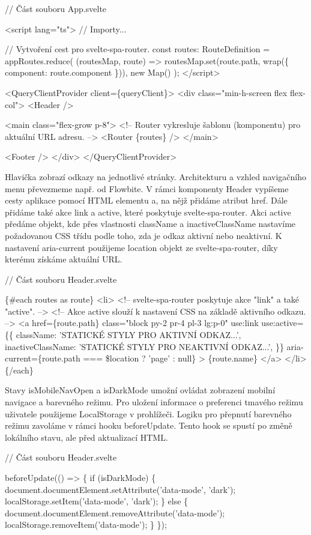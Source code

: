 \begin{prog}
// Část souboru App.svelte

<script lang="ts">
  // Importy...

  // Vytvoření cest pro svelte-spa-router.
  const routes: RouteDefinition = appRoutes.reduce(
    (routesMap, route) => routesMap.set(route.path, wrap(\{
      component: route.component
    \})),
    new Map()
  );
</script>

<QueryClientProvider client=\{queryClient\}>
  <div class="min-h-screen flex flex-col">
    <Header />

    <main class="flex-grow p-8">
      <!-- Router vykresluje šablonu (komponentu) pro aktuální URL adresu. -->
      <Router \{routes\} />
    </main>

    <Footer />
  </div>
</QueryClientProvider>
\end{prog}

Hlavička zobrazí odkazy na jednotlivé stránky. Architekturu a vzhled navigačního menu převezmeme např. od Flowbite. 
V rámci komponenty Header vypíšeme cesty aplikace pomocí HTML elementu a, na nějž přidáme atribut href. Dále přidáme také akce link a active, které poskytuje svelte-spa-router. 
Akci active předáme objekt, kde přes vlastnosti className a inactiveClassName nastavíme požadovanou CSS třídu podle toho, zda je odkaz aktivní nebo neaktivní. 
K nastavení aria-current použijeme location objekt ze svelte-spa-router, díky kterému získáme aktuální URL.

\begin{prog}
// Část souboru Header.svelte

\{#each routes as route\}
  <li>
    <!-- svelte-spa-router poskytuje akce "link" a také "active". -->
    <!-- Akce active slouží k nastavení CSS na základě aktivního odkazu. -->
    <a
      href=\{route.path\}
      class="block py-2 pr-4 pl-3 lg:p-0"
      use:link
      use:active=\{\{
        className: 'STATICKÉ STYLY PRO AKTIVNÍ ODKAZ...',
        inactiveClassName: 'STATICKÉ STYLY PRO NEAKTIVNÍ ODKAZ...',
      \}\}
      aria-current=\{route.path === \$location ? 'page' : null\}
    >
      \{route.name\}
    </a>
  </li>
\{/each\}
\end{prog}

Stavy isMobileNavOpen a isDarkMode umožní ovládat zobrazení mobilní navigace a barevného režimu. 
Pro uložení informace o preferenci tmavého režimu uživatele použijeme LocalStorage v prohlížeči. Logiku pro přepnutí barevného režimu zavoláme v rámci hooku beforeUpdate. 
Tento hook se spustí po změně lokálního stavu, ale před aktualizací HTML.

\begin{prog}
// Část souboru Header.svelte

beforeUpdate(() => \{
  if (isDarkMode) \{
    document.documentElement.setAttribute('data-mode', 'dark');
    localStorage.setItem('data-mode', 'dark');
  \} else \{
    document.documentElement.removeAttribute('data-mode');
    localStorage.removeItem('data-mode');
  \}
\});
\end{prog}